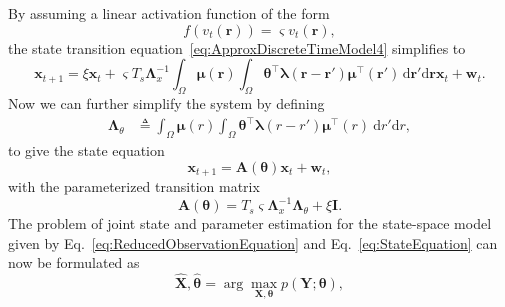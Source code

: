 \documentclass[review,authoryear,3p]{elsarticle}
\begin{document}
By assuming a linear activation function of the form
\begin{equation}
	f(v_t(\mathbf{r})) = \varsigma v_t(\mathbf{r}),
\end{equation}
the state transition equation~\eqref{eq:ApproxDiscreteTimeModel4} simplifies to
\begin{equation}\label{eq:ApproxDiscreteTimeModel_Linear}
	\mathbf{x}_{t+1} = 
	\xi \mathbf{x}_t + 
	\varsigma T_s \mathbf{\Lambda}_{x}^{-1} \int_{\Omega}\boldsymbol\mu\left(\mathbf{r}\right)\int_\Omega { 
	    \boldsymbol\theta^\top\boldsymbol\lambda\left(\mathbf{r}-\mathbf{r}'\right)
	    \boldsymbol\mu^\top\left(\mathbf{r}'\right) 
	\, \mathrm{d}\mathbf{r}'\mathrm{d}\mathbf{r}} \mathbf{x}_t
	+ \mathbf{w}_t.
\end{equation}
Now we can further simplify the system by defining
\begin{align}
	\label{eq:Lambdatheta}
	 \mathbf{\Lambda}_{\theta} &\triangleq \int_{\Omega}\boldsymbol\mu\left(r\right) \int_\Omega { 
		   \boldsymbol\theta^\top\boldsymbol\lambda\left(r-r'\right)
		    \boldsymbol\mu^\top\left(r\right)\ \mathrm{d}r'\mathrm{d}r},
\end{align}
to give the state equation
\begin{equation}\label{eq:StateEquation}
 \mathbf x_{t+1} =\mathbf A(\boldsymbol \theta) \mathbf x_t+ \mathbf w_t,
\end{equation} 
with the parameterized transition matrix
\begin{equation}\label{eq:A_theta}
 \mathbf A(\boldsymbol \theta)= T_s\varsigma\mathbf{\Lambda}_{x}^{-1}\mathbf{\Lambda}_{\theta}+\xi\mathbf I.
\end{equation} 
The problem of joint state and parameter estimation for the state-space model given by Eq.~\eqref{eq:ReducedObservationEquation} and Eq.~\eqref{eq:StateEquation}  can now be formulated as 
\begin{equation}
	{\hat{\mathbf X},\hat{\boldsymbol\theta}}=\arg\max_{\mathbf X,\boldsymbol\theta}p(\mathbf Y;\boldsymbol\theta),
 \end{equation}  
\end{document}
